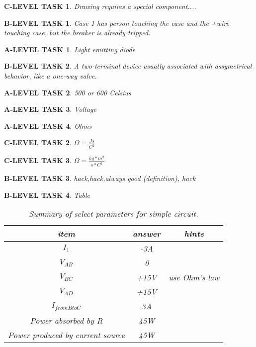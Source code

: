 \documentclass{book}
\numberwithin{equation}{section}
\newtheorem{alevel}{A-LEVEL TASK}
\newtheorem{blevel}{B-LEVEL TASK}
\newtheorem{clevel}{C-LEVEL TASK}
\theoremstyle{definition}
\begin{document}
\begin{clevel}Drawing requires a special component....\end{clevel}
\begin{blevel}Case 1 has person touching the case and the +wire touching case, but the breaker is already tripped.\end{blevel}
\begin{alevel}Light emitting diode\end{alevel}
\begin{blevel}A two-terminal device usually associated with assymetrical behavior, like a one-way valve.\end{blevel}
\begin{alevel}500 or 600 Celsius\end{alevel}
\begin{alevel}Voltage\end{alevel}
\begin{alevel}Ohms\end{alevel}
\begin{clevel}$\Omega=\frac{Js}{C^2}$\end{clevel}
\begin{clevel}$\Omega=\frac{kg*m^2}{s*C^2}$\end{clevel}
\begin{blevel}hack,hack,always good (definition), hack\end{blevel}

\begin{blevel}Table\par
\begin{table}[H]
\begin{center}
\begin{tabular}{|c|c|c|}\hline
item&answer&hints\\ \hline
$I_1$	&-3A	&	\\ \hline
$V_{AB}$	&0	&	\\ \hline
$V_{BC}$	&+15V	& use Ohm's law	\\ \hline
$V_{AD}$	&+15V	&	\\ \hline
$I_{from B to C}$	&3A	&	\\ \hline
Power absorbed by R	&45W	&	\\ \hline
Power produced by current source	&45W	&	\\ \hline
\end{tabular}
\label{T:21}
\caption{Summary of select parameters for simple circuit.}
\end{center}
\end{table}
\end{blevel}
\end{document}
